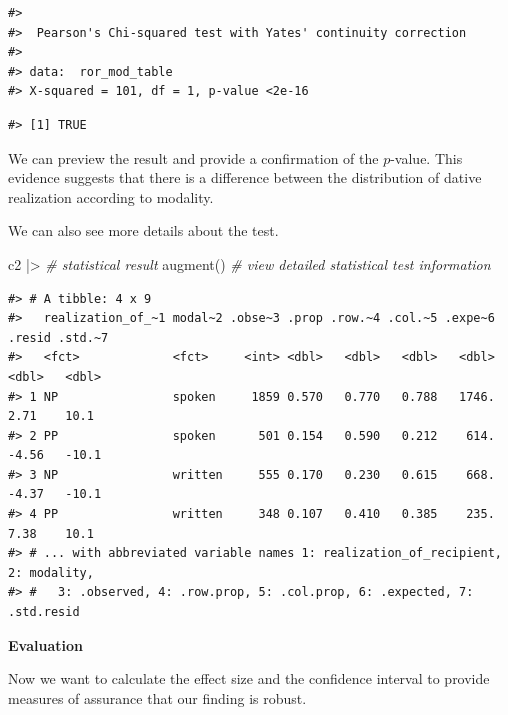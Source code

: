 \documentclass[
  letterpaper,
]{scrbook}
\newenvironment{Shaded}{\begin{snugshade}}{\end{snugshade}}
\newcommand{\CommentTok}[1]{\textcolor[rgb]{0.00,0.00,0.00}{\textit{#1}}}
\newcommand{\DecValTok}[1]{\textcolor[rgb]{0.00,0.00,0.00}{#1}}
\newcommand{\FunctionTok}[1]{\textcolor[rgb]{0.00,0.00,0.00}{#1}}
\newcommand{\NormalTok}[1]{\textcolor[rgb]{0.00,0.00,0.00}{#1}}
\newcommand{\SpecialCharTok}[1]{\textcolor[rgb]{0.00,0.00,0.00}{#1}}
\begin{document}
\begin{verbatim}
#> 
#>  Pearson's Chi-squared test with Yates' continuity correction
#> 
#> data:  ror_mod_table
#> X-squared = 101, df = 1, p-value <2e-16
\end{verbatim}

\begin{Shaded}
\end{Shaded}

\begin{verbatim}
#> [1] TRUE
\end{verbatim}

We can preview the result and provide a confirmation of the \(p\)-value.
This evidence suggests that there is a difference between the
distribution of dative realization according to modality.

We can also see more details about the test.

\begin{Shaded}
\begin{Highlighting}[]
\NormalTok{c2 }\SpecialCharTok{|\textgreater{}} \CommentTok{\# statistical result}
  \FunctionTok{augment}\NormalTok{() }\CommentTok{\# view detailed statistical test information}
\end{Highlighting}
\end{Shaded}

\begin{verbatim}
#> # A tibble: 4 x 9
#>   realization_of_~1 modal~2 .obse~3 .prop .row.~4 .col.~5 .expe~6 .resid .std.~7
#>   <fct>             <fct>     <int> <dbl>   <dbl>   <dbl>   <dbl>  <dbl>   <dbl>
#> 1 NP                spoken     1859 0.570   0.770   0.788   1746.   2.71    10.1
#> 2 PP                spoken      501 0.154   0.590   0.212    614.  -4.56   -10.1
#> 3 NP                written     555 0.170   0.230   0.615    668.  -4.37   -10.1
#> 4 PP                written     348 0.107   0.410   0.385    235.   7.38    10.1
#> # ... with abbreviated variable names 1: realization_of_recipient, 2: modality,
#> #   3: .observed, 4: .row.prop, 5: .col.prop, 6: .expected, 7: .std.resid
\end{verbatim}

\textbf{Evaluation}

Now we want to calculate the effect size and the confidence interval to
provide measures of assurance that our finding is robust.
\end{document}

